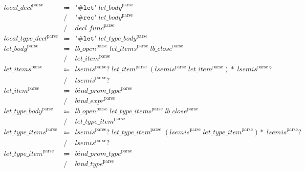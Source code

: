 \begin{align*}
    \begin{array}{rcll}
        \mathit{local\_decl}^\mathrm{parse}
        &\Coloneq &\texttt{"\#let"}\; \mathit{let\_body}^\mathrm{parse} \\
        &\mathrel{/} &\texttt{"\#rec"}\; \mathit{let\_body}^\mathrm{parse} \\
        &\mathrel{/} &\mathit{decl\_func}^\mathrm{parse} \\
        \mathit{local\_type\_decl}^\mathrm{parse}
        &\Coloneq &\texttt{"\#let"}\; \mathit{let\_type\_body}^\mathrm{parse} \\
        \mathit{let\_body}^\mathrm{parse}
        &\Coloneq &\mathit{lb\_open}^\mathrm{parse}\; \mathit{let\_items}^\mathrm{parse}\; \mathit{lb\_close}^\mathrm{parse} \\
        &\mathrel{/} &\mathit{let\_item}^\mathrm{parse} \\
        \mathit{let\_items}^\mathrm{parse}
        &\Coloneq &\mathit{lsemis}^\mathrm{parse}{?}\; \mathit{let\_item}^\mathrm{parse}\; (\mathit{lsemis}^\mathrm{parse}\; \mathit{let\_item}^\mathrm{parse}){*}\; \mathit{lsemis}^\mathrm{parse}{?} \\
        &\mathrel{/} &\mathit{lsemis}^\mathrm{parse}{?} \\
        \mathit{let\_item}^\mathrm{parse}
        &\Coloneq &\mathit{bind\_prom\_type}^\mathrm{parse} \\
        &\mathrel{/} &\mathit{bind\_expr}^\mathrm{parse} \\
        \mathit{let\_type\_body}^\mathrm{parse}
        &\Coloneq &\mathit{lb\_open}^\mathrm{parse}\; \mathit{let\_type\_items}^\mathrm{parse}\; \mathit{lb\_close}^\mathrm{parse} \\
        &\mathrel{/} &\mathit{let\_type\_item}^\mathrm{parse} \\
        \mathit{let\_type\_items}^\mathrm{parse}
        &\Coloneq &\mathit{lsemis}^\mathrm{parse}{?}\; \mathit{let\_type\_item}^\mathrm{parse}\; (\mathit{lsemis}^\mathrm{parse}\; \mathit{let\_type\_item}^\mathrm{parse}){*}\; \mathit{lsemis}^\mathrm{parse}{?} \\
        &\mathrel{/} &\mathit{lsemis}^\mathrm{parse}{?} \\
        \mathit{let\_type\_item}^\mathrm{parse}
        &\Coloneq & \mathit{bind\_prom\_type}^\mathrm{parse} \\
        &\mathrel{/} &\mathit{bind\_type}^\mathrm{parse}
    \end{array}
\end{align*}

